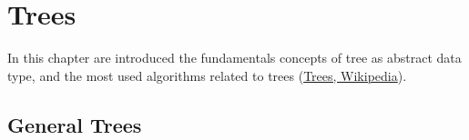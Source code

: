 \setchapterpreamble[u]{\margintoc}
\chapter{Trees}
In this chapter are introduced the fundamentals concepts of tree as abstract data type, and the most used algorithms related to trees \cite{wikitrees} (\href{https://en.wikipedia.org/wiki/Tree_(data_structure)}{Trees, Wikipedia}).

\section{General Trees}
